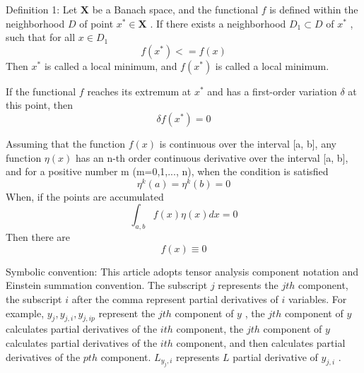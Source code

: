 \begin{theorem} 
Definition 1: Let $ \bm {X}$   be a Banach space, and the functional $ f $  is defined within the neighborhood $ D $  of point $ x ^ * \in \bm {X}$  . If there exists a neighborhood $ D_1 \subset D$  of $ x ^ * $ , such that for all $ x \in D_1 $ 
\begin{equation}\label{eq:(2.1.1)}
f(x^*)<=f(x)
\end{equation}
Then $ x ^ * $ is called a local minimum, and $ f (x ^ *) $ is called a local minimum.
\end{theorem}
\begin{theorem} 
If the functional $ f $ reaches its extremum at $ x ^ * $ and has a first-order variation $ \delta $ at this point, then
\begin{equation}\label{eq:(2.1.2)}
\delta f(x^*)=0
\end{equation}
\end{theorem}
\begin{lemma} 
Assuming that the function $ f (x) $ is continuous over the interval [a, b], any function $ \eta (x) $ has an n-th order continuous derivative over the interval [a, b], and for a positive number m (m=0,1,..., n), when the condition is satisfied
\begin{equation}
\eta^{k}(a)=\eta^{k}(b)=0
\end{equation}
When, if the points are accumulated
\begin{equation}\label{eq:(2.1.2)}
\int_ {a,b}f (x)\eta(x)dx=0
\end{equation}   
Then there are
\begin{equation}\label{eq:(2.1.2)}
f(x)\equiv 0
\end{equation}   
\end{lemma}
Symbolic convention: This article adopts tensor analysis component notation and Einstein summation convention. The subscript $ j$  represents the $ jth$  component, the subscript $ i$ after the comma represent partial derivatives of $ i$  variables. For example, $ y_j, y_{j, i}, y_{j, ip}$  represent the $ jth$  component of $ y$  , the $ jth$  component of $ y$  calculates partial derivatives of the $ ith$   component, the $ jth$  component of $ y$  calculates partial derivatives of the $ ith$   component, and then calculates partial derivatives of the $ pth$ component. $ L_{y_j, i}$  represents $ L$  partial derivative of $ y_{j, i}$  .


